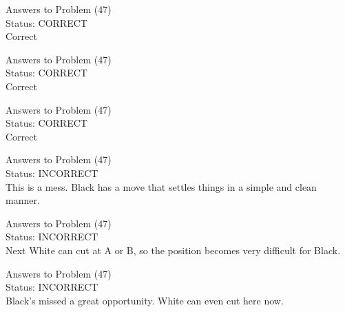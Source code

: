 \documentclass[11pt]{article}
\begin{document}
\begin{minipage}[t]{0.5\textwidth}
  {\centering
  
  Answers to Problem (47)\\
  Status: CORRECT\\
  Correct\\
  }
\end{minipage}
\begin{minipage}[t]{0.5\textwidth}
  {\centering
  
  Answers to Problem (47)\\
  Status: CORRECT\\
  Correct\\
  }
\end{minipage}
\begin{minipage}[t]{0.5\textwidth}
  {\centering
  
  Answers to Problem (47)\\
  Status: CORRECT\\
  Correct\\
  }
\end{minipage}
\begin{minipage}[t]{0.5\textwidth}
  {\centering
  
  Answers to Problem (47)\\
  Status: INCORRECT\\
  This is a mess. Black has a move that settles things in a simple and clean manner.\\
  }
\end{minipage}
\begin{minipage}[t]{0.5\textwidth}
  {\centering
  
  Answers to Problem (47)\\
  Status: INCORRECT\\
  Next White can cut at A or B, so the position becomes very difficult for Black.\\
  }
\end{minipage}
\begin{minipage}[t]{0.5\textwidth}
  {\centering
  
  Answers to Problem (47)\\
  Status: INCORRECT\\
  Black's missed a great opportunity. White can even cut here now.\\
  }
\end{minipage}
\end{document}
